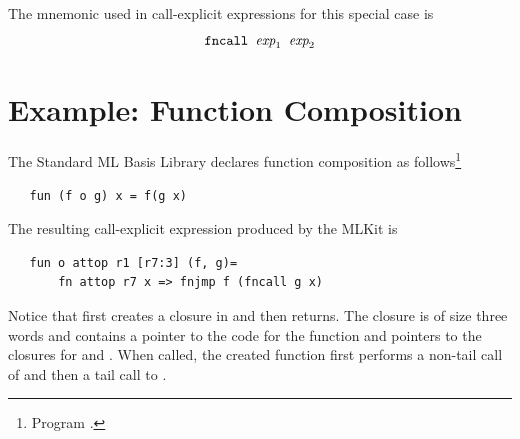 \documentclass[12pt]{book}
\begin{document}
The mnemonic used in call-explicit expressions for this special case is
$$\hbox{\tt fncall $\hbox{\it exp}_1$ $\hbox{\it exp}_2$}$$

\section{Example: Function Composition}
The Standard ML Basis Library declares function composition as
follows\footnote{Program .}
\begin{verbatim}
   fun (f o g) x = f(g x)
\end{verbatim}
The resulting call-explicit expression produced by the MLKit is
\begin{verbatim}
   fun o attop r1 [r7:3] (f, g)= 
       fn attop r7 x => fnjmp f (fncall g x)
\end{verbatim}
Notice that 
%
 first creates a closure in  and then returns.
The closure is of size three words and contains a pointer to the code
for the function and pointers to the closures for  and
. When called, the created function first performs a non-tail
call of  and then a tail call to .
\end{document}
